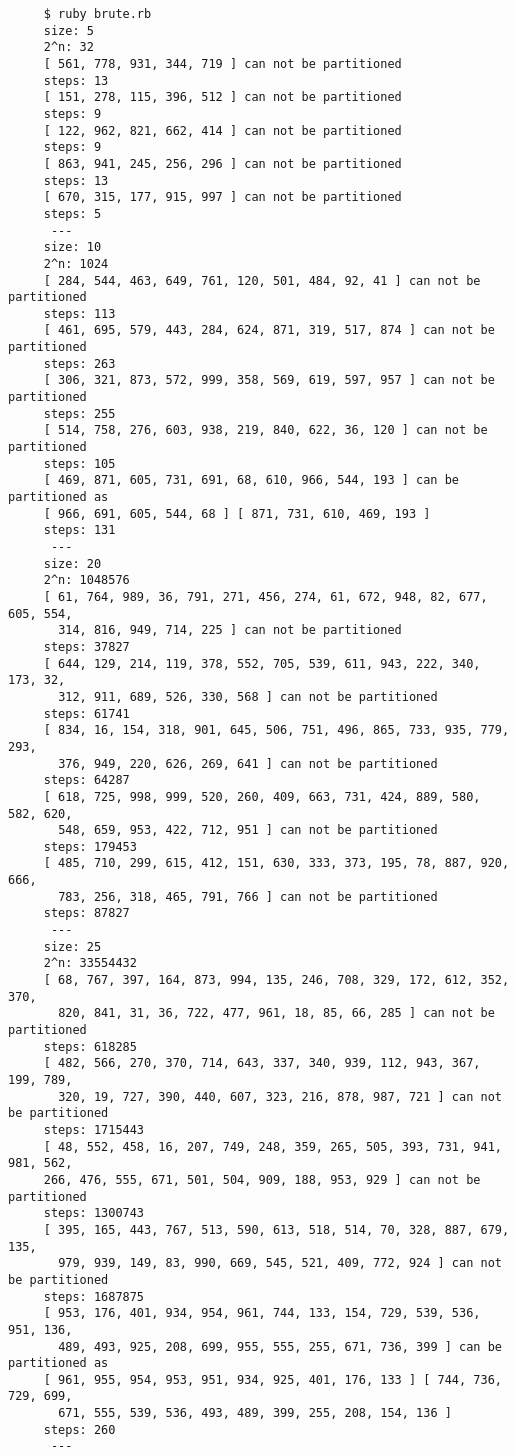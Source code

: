 \documentclass[11pt]{article}
\begin{document}
\begin{verbatim}
     $ ruby brute.rb
     size: 5
     2^n: 32
     [ 561, 778, 931, 344, 719 ] can not be partitioned
     steps: 13
     [ 151, 278, 115, 396, 512 ] can not be partitioned
     steps: 9
     [ 122, 962, 821, 662, 414 ] can not be partitioned
     steps: 9
     [ 863, 941, 245, 256, 296 ] can not be partitioned
     steps: 13
     [ 670, 315, 177, 915, 997 ] can not be partitioned
     steps: 5
      ---
     size: 10
     2^n: 1024
     [ 284, 544, 463, 649, 761, 120, 501, 484, 92, 41 ] can not be partitioned
     steps: 113
     [ 461, 695, 579, 443, 284, 624, 871, 319, 517, 874 ] can not be partitioned
     steps: 263
     [ 306, 321, 873, 572, 999, 358, 569, 619, 597, 957 ] can not be partitioned
     steps: 255
     [ 514, 758, 276, 603, 938, 219, 840, 622, 36, 120 ] can not be partitioned
     steps: 105
     [ 469, 871, 605, 731, 691, 68, 610, 966, 544, 193 ] can be partitioned as
     [ 966, 691, 605, 544, 68 ] [ 871, 731, 610, 469, 193 ]
     steps: 131
      ---
     size: 20
     2^n: 1048576
     [ 61, 764, 989, 36, 791, 271, 456, 274, 61, 672, 948, 82, 677, 605, 554,
       314, 816, 949, 714, 225 ] can not be partitioned
     steps: 37827
     [ 644, 129, 214, 119, 378, 552, 705, 539, 611, 943, 222, 340, 173, 32,
       312, 911, 689, 526, 330, 568 ] can not be partitioned
     steps: 61741
     [ 834, 16, 154, 318, 901, 645, 506, 751, 496, 865, 733, 935, 779, 293,
       376, 949, 220, 626, 269, 641 ] can not be partitioned
     steps: 64287
     [ 618, 725, 998, 999, 520, 260, 409, 663, 731, 424, 889, 580, 582, 620,
       548, 659, 953, 422, 712, 951 ] can not be partitioned
     steps: 179453
     [ 485, 710, 299, 615, 412, 151, 630, 333, 373, 195, 78, 887, 920, 666,
       783, 256, 318, 465, 791, 766 ] can not be partitioned
     steps: 87827
      ---
     size: 25
     2^n: 33554432
     [ 68, 767, 397, 164, 873, 994, 135, 246, 708, 329, 172, 612, 352, 370,
       820, 841, 31, 36, 722, 477, 961, 18, 85, 66, 285 ] can not be partitioned
     steps: 618285
     [ 482, 566, 270, 370, 714, 643, 337, 340, 939, 112, 943, 367, 199, 789,
       320, 19, 727, 390, 440, 607, 323, 216, 878, 987, 721 ] can not be partitioned
     steps: 1715443
     [ 48, 552, 458, 16, 207, 749, 248, 359, 265, 505, 393, 731, 941, 981, 562,
     266, 476, 555, 671, 501, 504, 909, 188, 953, 929 ] can not be partitioned
     steps: 1300743
     [ 395, 165, 443, 767, 513, 590, 613, 518, 514, 70, 328, 887, 679, 135,
       979, 939, 149, 83, 990, 669, 545, 521, 409, 772, 924 ] can not be partitioned
     steps: 1687875
     [ 953, 176, 401, 934, 954, 961, 744, 133, 154, 729, 539, 536, 951, 136,
       489, 493, 925, 208, 699, 955, 555, 255, 671, 736, 399 ] can be partitioned as
     [ 961, 955, 954, 953, 951, 934, 925, 401, 176, 133 ] [ 744, 736, 729, 699,
       671, 555, 539, 536, 493, 489, 399, 255, 208, 154, 136 ]
     steps: 260
      ---
\end{verbatim}
\end{document}
